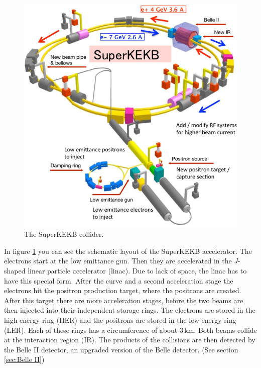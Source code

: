 \documentclass[a4paper,11pt,twosided,final,german,openbib,pdftex,listof=totoc,bibliography=totoc]{scrbook}
\begin{document}
\begin{figure}[h!]
\begin{center}
	\includegraphics[width=\textwidth]{Bilder/SuperKEKB.png}
	
	\caption[SuperKEKB Collider]{The SuperKEKB collider.\cite{SKEKAcc}}
	\label{fig:SuperKEKB}
\end{center}
\end{figure}


In figure \ref{fig:SuperKEKB} you can see the schematic layout of the SuperKEKB accelerator. The electrons start at the low emittance gun. Then they are accelerated in the \textit{J}-shaped linear particle accelerator (linac). Due to lack of space, the linac has to have this special form.\cite{KEKBJArc} After the curve and a second acceleration stage the electrons hit the positron production target, where the positrons are created. After this target there are more acceleration stages, before the two beams are then injected into their independent storage rings. The electrons are stored in the high-energy ring (HER) and the positrons are stored in the low-energy ring (LER). Each of these rings has a circumference of about $3\,\textrm{km}$. Both beams collide at the interaction region (IR). The products of the collisions are then detected by the Belle II detector, an upgraded version of the Belle detector.\cite{B2B} (See section \ref{sec:Belle II})
\end{document}
